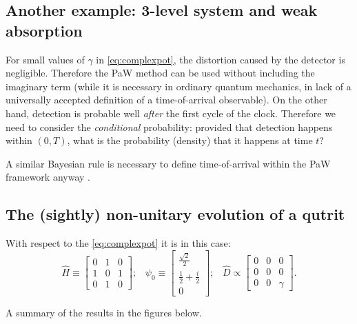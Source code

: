 \documentclass[a0,portrait]{a0poster}
\DeclareMathOperator*{\repr}{\equiv}      %
\begin{document}
\begin{multicols}{2}
\section*{Another example: 3-level system and weak absorption}

For small values of $\gamma$ in \eqref{eq:complexpot},
the distortion caused by the detector is negligible.
Therefore the PaW method can be used without including the imaginary term
(while it is necessary in ordinary quantum mechanics,
in lack of a universally accepted definition of a time-of-arrival observable).
On the other hand, detection is probable well \emph{after} the first cycle of the clock.
Therefore we need to consider the \emph{conditional} probability: provided that detection happens
within $(0, T)$, what is the probability (density) that it happens at time $t$?

A similar Bayesian rule is necessary to define time-of-arrival within the PaW framework
anyway \cite{Maccone:QMOT}.

\subsection*{The (sightly) non-unitary evolution of a qutrit}
With respect to the \eqref{eq:complexpot} it is in this case:
\begin{equation}
  \hat{H} \repr \left[\begin{matrix}0 & 1 & 0\\1 & 0 & 1\\0 & 1 & 0\end{matrix}\right] \text{;} \quad
  \psi_0 \repr \left[\begin{matrix}\frac{\sqrt{2}}{2}\\\frac{1}{2} + \frac{i}{2}\\0\end{matrix}\right] \text{;} \quad
  \hat{D} \propto \left[\begin{matrix}0 & 0 & 0\\0 & 0 & 0\\0 & 0 & \gamma\end{matrix}\right] \text{.}
\end{equation}

A summary of the results in the figures below.
\vspace{0.5cm}


\end{multicols}
\end{document}
